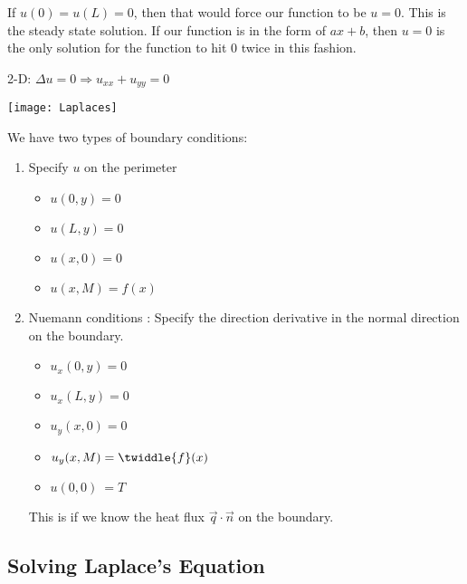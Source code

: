 \begin{enumerate}
  If $u(0) = u(L) = 0$, then that would force our function to be $u = 0$. This is the steady state solution. If our function is in the form of $ax + b$, then $u = 0$ is the only solution for the function to hit $0$ twice in this fashion.

  2-D: $\Delta u = 0 \Rightarrow u_{xx} + u_{yy} = 0$

  \begin{center}
    \texttt{[image: Laplaces]}
  \end{center}

  We have two types of boundary conditions:
  \begin{enumerate}
    \item Specify $u$ on the perimeter
    \begin{itemize}
      \item $u(0, y) = 0$
      \item $u(L, y) = 0$
      \item $u(x, 0) = 0$
      \item $u(x, M) = f(x)$
    \end{itemize}
    \item Nuemann conditions :
    Specify the direction derivative in the normal direction on the boundary.
    \begin{itemize}
      \item $u_x(0, y) = 0$
      \item $u_x(L, y) = 0$
      \item $u_y(x, 0) = 0$
      \item $u_y(x, M) = \twiddle{f}(x)$
      \item $u(0, 0)\  = T$
    \end{itemize}
    This is if we know the heat flux $\vec q \cdot \vec n$ on the boundary.
  \end{enumerate}
\end{enumerate}

\bigbreak

\subsection{Solving Laplace's Equation}

